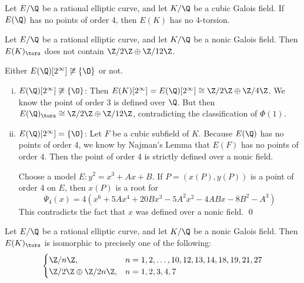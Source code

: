 \begin{frame}[plain,c]
\footnotesize
\begin{lem}[Najman, 2015]
Let $E/\Q$ be a rational elliptic curve, and let $K/\Q$ be a cubic Galois field. If $E(\Q)$ has no points of order 4, then $E(K)$ has no 4-torsion. 
\end{lem}

\begin{lem}[M.]
Let $E/\Q$ be a rational elliptic curve, and let $K/\Q$ be a nonic Galois field. Then $E(K)_\tors$ does not contain $\Z/2\Z \oplus \Z/12\Z$.
\end{lem}

\pfsk Either $E(\Q)[2^\infty] \not\cong \{ \O \}$ or not.
	\begin{enumerate}[(i)] \footnotesize
	\item $E(\Q)[2^\infty] \not\cong \{ \O \}$: Then $E(K)[2^\infty]= E(\Q)[2^\infty] \cong \Z/2\Z \oplus \Z/4\Z$. We know the point of order 3 is defined over $\Q$. But then $E(\Q)_\tors \cong \Z/2\Z \oplus \Z/12\Z$, contradicting the classification of $\Phi(1)$. 
	\item $E(\Q)[2^\infty]= \{ \O \}$: Let $F$ be a cubic subfield of $K$. Because $E(\Q)$ has no points of order 4, we know by Najman's Lemma that $E(F)$ has no points of order 4. Then the point of order 4 is strictly defined over a nonic field.\pspace
	
	Choose a model $E: y^2= x^3 + Ax + B$. If $P= (x(P), y(P))$ is a point of order 4 on $E$, then $x(P)$ is a root for 
		\[
		\Psi_4(x)= 4( x^6 + 5Ax^4 + 20Bx^3 - 5A^2x^2 - 4ABx - 8B^2 - A^3)
		\]
	This contradicts the fact that $x$ was defined over a nonic field. \hfill \qed
	\end{enumerate}
\end{frame}





\begin{frame}[plain,c]
\begin{thm}[M.]
Let $E/\Q$ be a rational elliptic curve, and let $K/\Q$ be a nonic Galois field. Then $E(K)_\tors$ is isomorphic to precisely one of the following:
	\[
	\begin{cases}
	\Z/n\Z, & n= 1, 2, \ldots, 10, 12, 13, 14, 18, 19, 21, 27 \\
	\Z/2\Z \oplus \Z/2n\Z, & n= 1, 2, 3, 4, 7
	\end{cases}
	\]
\end{thm}
\end{frame}





